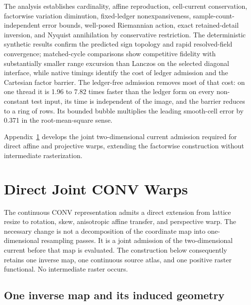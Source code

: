 \documentclass[journal]{IEEEtran}
\begin{document}
The analysis establishes cardinality, affine reproduction, cell-current
conservation, factorwise variation diminution, fixed-ledger nonexpansiveness,
sample-count-independent error bounds, well-posed Riemannian action, exact
retained-detail inversion, and Nyquist annihilation by conservative
restriction. The deterministic synthetic results confirm the predicted sign
topology and rapid resolved-field convergence; matched-cycle comparisons show
competitive fidelity with substantially smaller range excursion than
Lanczos on the selected diagonal interface, while native timings identify
the cost of ledger admission and the Cartesian factor barrier. The
ledger-free admission removes most of that cost: on one thread it is
1.96 to 7.82 times faster than the ledger form on every non-constant
test input, its time is independent of the image, and the barrier
reduces to a ring of rows. Its bounded bubble multiplies the leading
smooth-cell error by 0.371 in the root-mean-square sense.

Appendix~\ref{app:directwarp} develops the joint two-dimensional current
admission required for direct affine and projective warps, extending the
factorwise construction without intermediate rasterization.

\providecommand{\WarpFigureRoot}{../support_geometry}
\appendices
\section{Direct Joint CONV Warps}
\label{app:directwarp}

The continuous CONV representation admits a direct extension from lattice
resize to rotation, skew, anisotropic affine transfer, and perspective warp.
The necessary change is not a decomposition of the coordinate map into
one-dimensional resampling passes.  It is a joint admission of the
two-dimensional current before that map is evaluated.  The construction
below consequently retains one inverse map, one continuous source atlas, and
one positive raster functional.  No intermediate raster occurs.

\subsection{One inverse map and its induced geometry}
\end{document}
